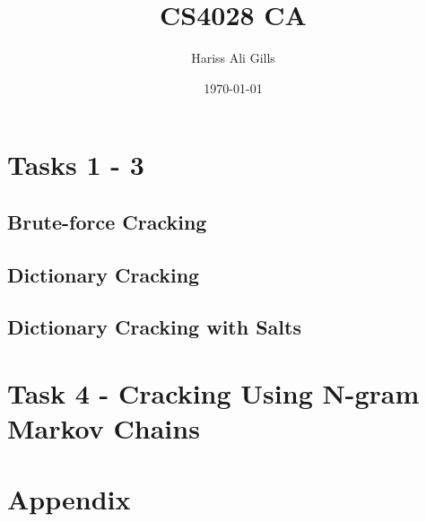 \documentclass{report}
\title{CS4028 CA}
\author{Hariss Ali Gills}
\date{\today}
\begin{document}
\maketitle
\tableofcontents
\chapter{Tasks 1 - 3}
\section{Brute-force Cracking}

\section{Dictionary Cracking}

\section{Dictionary Cracking with Salts}

\chapter{Task 4 - Cracking Using N-gram Markov Chains}

\appendix
\chapter{Appendix}



\end{document}
